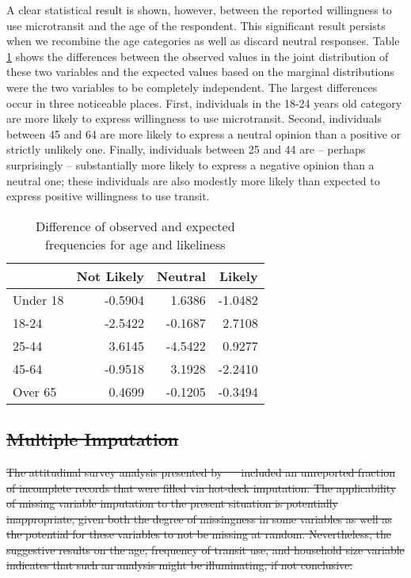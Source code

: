 \documentclass[smartcities,article,submit,moreauthors,pdftex]{Definitions/mdpi}
\providecommand{\DIFdel}[1]{{\protect\color{red}\sout{#1}}}                      %
\providecommand{\DIFdelbegin}{} %
\begin{document}
A clear statistical result is shown, however, between the reported willingness to use microtransit and the age of the respondent. This significant result persists when we recombine the age categories as well as discard neutral responses. Table \ref{tab:age-difference} shows the differences between the observed values in the joint distribution of these two variables and the expected values based on the marginal distributions were the two variables to be completely independent. The largest differences occur in three noticeable places. First, individuals in the 18-24 years old category are more likely to express willingness to use microtransit. Second, individuals between 45 and 64 are more likely to express a neutral opinion than a positive or strictly unlikely one. Finally, individuals between 25 and 44 are -- perhaps surprisingly -- substantially more likely to express a negative opinion than a neutral one; these individuals are also modestly more likely than expected to express positive willingness to use transit.

\begin{table}[ht]
    \centering
    \caption{Difference of observed and expected frequencies for age and likeliness}
    \label{tab:age-difference}
\begin{tabular}[t]{lrrr}
\toprule
  & Not Likely & Neutral & Likely\\
\midrule
Under 18 & -0.5904 & 1.6386 & -1.0482\\
18-24 & -2.5422 & -0.1687 & 2.7108\\
25-44 & 3.6145 & -4.5422 & 0.9277\\
45-64 & -0.9518 & 3.1928 & -2.2410\\
Over 65 & 0.4699 & -0.1205 & -0.3494\\
\bottomrule
\end{tabular}
\end{table}



\DIFdelbegin \subsection{\DIFdel{Multiple Imputation}}
\addtocounter{subsection}{-1}%
\DIFdel{The attitudinal survey analysis presented by \mbox{%
\citet{KONIG2020954} }\hspace{0pt}%
included an unreported fraction of incomplete records that were filled via hot-deck imputation. The applicability of missing variable imputation to the present situation is potentially inappropriate, given both the degree of missingness in some variables as well as the potential for these variables to not be missing at random. Nevertheless, the suggestive results on the age, frequency of transit use, and household size variable indicates that such an analysis might be illuminating, if not conclusive.
}%
\end{document}
